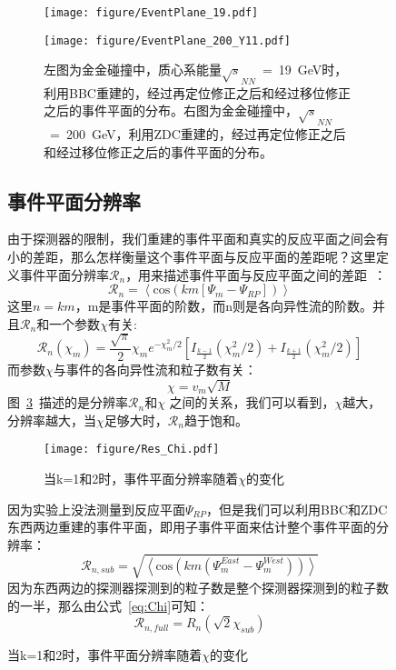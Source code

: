 \begin{figure}[htbp]
\begin{figure}[htbp]
\begin{minipage}[t]{0.5\textwidth}
\centering
\texttt{[image: figure/EventPlane\_19.pdf]}
\end{minipage}
\begin{minipage}[t]{0.5\textwidth}
\centering
\texttt{[image: figure/EventPlane\_200\_Y11.pdf]}
\end{minipage}
\caption{左图为金金碰撞中，质心系能量$\sqrt{s}_{NN}$~=~19~GeV时，利用BBC重建的，经过再定位修正之后和经过移位修正之后的事件平面的分布。右图为金金碰撞中，$\sqrt{s}_{NN}$~=~200~GeV，利用ZDC重建的，经过再定位修正之后和经过移位修正之后的事件平面的分布。}
\label{fig:EP_dis_19_200}
\end{figure}

\subsection{事件平面分辨率}
由于探测器的限制，我们重建的事件平面和真实的反应平面之间会有小的差距，那么怎样衡量这个事件平面与反应平面的差距呢？这里定义事件平面分辨率$\mathcal{R}_{n}$，用来描述事件平面与反应平面之间的差距~\cite{Poskanzer:1998yz,Voloshin:2008dg}：
\begin{equation}
\label{eq:Res_EP}
\mathcal{R}_{n} = \left\langle \mathrm{cos}(km[\Psi_{m}-\Psi_{RP}]) \right\rangle
\end{equation}
这里$n=km$，m是事件平面的阶数，而n则是各向异性流的阶数。并且$\mathcal{R}_{n}$和一个参数$\chi$有关:
\begin{equation}
\label{eq:Res_Chi}
\mathcal{R}_{n}(\chi_{m}) = \frac{\sqrt{\pi}}{2}\chi_{m} e^{-\chi_{m}^2/2} \left[ I_{\frac{k-1}{2}}(\chi_{m}^2/2) + I_{\frac{k+1}{2}}(\chi_{m}^2/2) \right]
\end{equation}
而参数$\chi$与事件的各向异性流和粒子数有关：
\begin{equation}
\label{eq:Chi}
\chi = v_{m}\sqrt{M}
\end{equation}
图~\ref{fig:Res_Chi}~\cite{Voloshin:2008dg}描述的是分辨率$\mathcal{R}_{n}$和$\chi$ 之间的关系，我们可以看到，$\chi$越大，分辨率越大，当$\chi$足够大时，$\mathcal{R}_{n}$趋于饱和。
\begin{figure}[htbp]
\centering
\texttt{[image: figure/Res\_Chi.pdf]}
\caption{当k=1和2时，事件平面分辨率随着$\chi$的变化}
\label{fig:Res_Chi}
\end{figure}

因为实验上没法测量到反应平面$\Psi_{RP}$，但是我们可以利用BBC和ZDC东西两边重建的事件平面，即用子事件平面来估计整个事件平面的分辨率：
\begin{equation}
\label{eq:Res_Chi_sub}
\mathcal{R}_{n,sub} = \sqrt{\left\langle \mathrm{cos}(km(\Psi_{m}^{East} - \Psi_{m}^{West})) \right\rangle}
\end{equation}
因为东西两边的探测器探测到的粒子数是整个探测器探测到的粒子数的一半，那么由公式~\ref{eq:Chi}可知：
\begin{equation}
\label{Res_full_sub}
\mathcal{R}_{n,full} = R_{n}(\sqrt{2}\chi_{sub})
\end{equation}


\end{figure}
